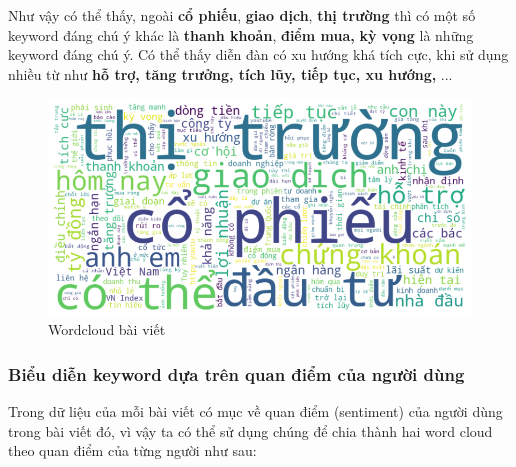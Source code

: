 Như vậy có thể thấy, ngoài \textbf{cổ phiếu}, \textbf{giao dịch}, \textbf{thị trường} thì có một số keyword đáng chú ý khác là \textbf{thanh khoản}, \textbf{điểm mua,} \textbf{kỳ vọng }là những keyword đáng chú ý. Có thể thấy diễn đàn có xu hướng khá tích cực, khi sử dụng nhiều từ như \textbf{hỗ trợ, tăng trưởng, tích lũy, tiếp tục, xu hướng,} ...

\begin{figure}[H]
    \centering
    \includegraphics[width=0.9\linewidth]{images/plot-2.1-wordcloud.png}
    \vspace{-1em}
    \caption{Wordcloud bài viết}
    \label{fig:2.3}
\end{figure}

\subsubsection{Biểu diễn keyword dựa trên quan điểm của người dùng}

Trong dữ liệu của mỗi bài viết có mục về quan điểm (sentiment) của người dùng trong bài viết đó, vì vậy ta có thể sử dụng chúng để chia thành hai word cloud theo quan điểm của từng người như sau:

